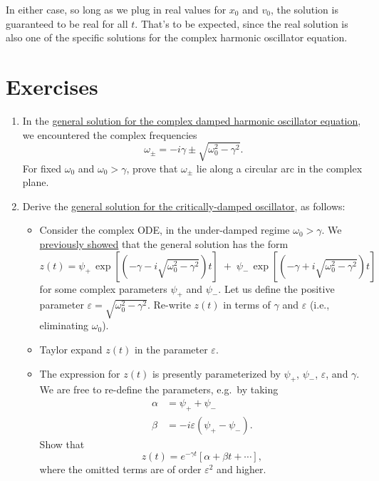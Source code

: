 \documentclass[10pt,a4paper]{article}
\begin{document}
In either case, so long as we plug in real values for $x_0$ and $v_0$,
the solution is guaranteed to be real for all $t$. That's to be
expected, since the real solution is also one of the specific
solutions for the complex harmonic oscillator equation.

\section{Exercises}\label{exercises}

\begin{enumerate}
\item
In the \hyperref[general-solution]{general solution for the complex
  damped harmonic oscillator equation}, we encountered the complex
frequencies
\begin{equation}
\omega_\pm = -i\gamma \pm \sqrt{\omega_0^2 - \gamma^2}.
\end{equation}For
fixed $\omega_0$ and $\omega_0 > \gamma$, prove that $\omega_\pm$ lie
along a circular arc in the complex plane.

\item
Derive the \hyperref[critical-damping]{general solution for the
  critically-damped oscillator}, as follows:

\begin{itemize}
\item Consider the complex ODE, in the under-damped regime $\omega_0 >
  \gamma$. We \hyperref[general-solution]{previously showed} that the
  general solution has the form
\begin{equation}
z(t) = \psi_+ \, \exp\left[\left(-\gamma  - i \sqrt{\omega_0^2 - \gamma^2}\right)t\right] \; +\; \psi_- \, \exp\left[\left(-\gamma +i\sqrt{\omega_0^2 - \gamma^2}\right)t\right]
\end{equation}
for some complex parameters $\psi_+$ and $\psi_-$. Let us define the
positive parameter $\varepsilon = \sqrt{\omega_0^2 - \gamma^2}$.
Re-write $z(t)$ in terms of $\gamma$ and $\varepsilon$ (i.e.,
eliminating $\omega_0$).

\item
Taylor expand $z(t)$ in the parameter $\varepsilon$.

\item
The expression for $z(t)$ is presently parameterized by $\psi_+$,
$\psi_-$, $\varepsilon$, and $\gamma$. We are free to re-define the
parameters, e.g.~by taking
\begin{align}
  \alpha &= \psi_+ + \psi_- \\ \beta &= -i\varepsilon(\psi_+ - \psi_-).
\end{align}
Show that
\begin{equation}
z(t) = e^{-\gamma t}\left[\alpha + \beta t + \cdots\right],
\end{equation}
where the omitted terms are of order $\varepsilon^2$ and higher.


\end{itemize}
\end{enumerate}
\end{document}
